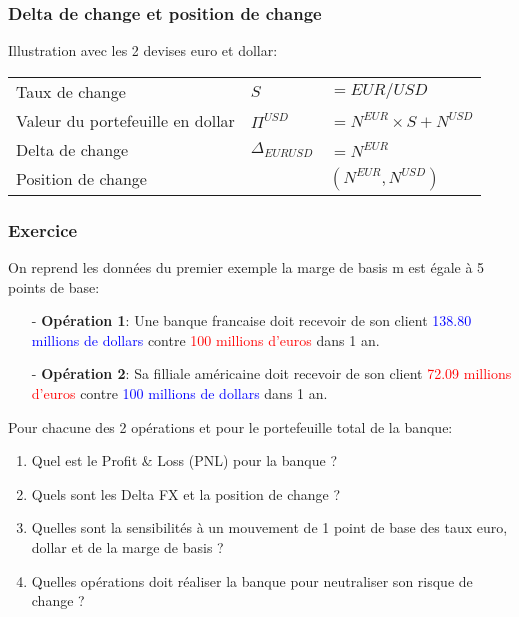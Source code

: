 \documentclass{beamer}
\begin{document}
\begin{frame}
\frametitle{Delta de change et position de change}
\small
Illustration avec les 2 devises euro et dollar:\\ 
\vspace{0.5cm}
\begin{tabular}{|l|l l|}
\hline
Taux de change&$S$&$= EUR/USD$\\
Valeur du portefeuille en dollar&$\Pi^{USD}$&$=N^{EUR} \times S + N^{USD}$\\
Delta de change&$\Delta_{EURUSD}$&$=N^{EUR}$\\
Position de change&&$(N^{EUR},N^{USD})$\\
\hline
\end{tabular}
\end{frame}

\begin{frame}
\frametitle{Exercice}
On reprend les données du premier exemple la marge de basis m est égale à 5 points de base:\\
\begin{itemize}
\item[-] \textbf{Opération 1}: Une banque francaise doit recevoir de son client \textcolor{blue}{138.80 millions de dollars} contre \textcolor{red}{100 millions d'euros} dans 1 an.
\item[-] \textbf{Opération 2}: Sa filliale américaine doit recevoir de son client \textcolor{red}{72.09 millions d'euros} contre \textcolor{blue}{100 millions de dollars} dans 1 an.
\end{itemize}
Pour chacune des 2 opérations et pour le portefeuille total de la banque:\\
\begin{enumerate}
\item Quel est le Profit \& Loss (PNL) pour la banque ?
\item Quels sont les Delta FX et la position de change ?
\item Quelles sont la sensibilités à un mouvement de 1 point de base des taux euro, dollar et de la marge de basis ?
\item Quelles opérations doit réaliser la banque pour neutraliser son risque de change ?
\end{enumerate}
\end{frame}
\end{document}
